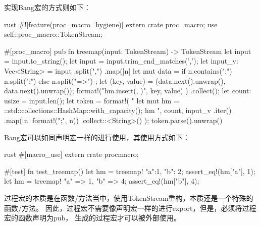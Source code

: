 实现Bang宏的方式则如下：
\begin{code-block}{rust}
#![feature(proc_macro_hygiene)]
extern crate proc_macro;
use self::proc_macro::TokenStream;

#[proc_macro]
pub fn treemap(input: TokenStream) -> TokenStream {
    let input = input.to_string();
    let input = input.trim_end_matches(',');
    let input_v: Vec<String> = input
        .split(",")
        .map(|n| {
            let mut data = if n.contains(":") {
                n.split(":")
            } else {
                n.split("=>")
            };
            let (key, value) = (data.next().unwrap(), data.next().unwrap());
            format!("hm.insert({}, {})", key, value)
        })
        .collect();
    let count: usize = input.len();
    let token = format!(
        "{{
        let mut hm = ::std::collections::HashMap::with_capacity({});
        {}
        hm
    }}",
        count,
        input_v
            .iter()
            .map(|n| format!("{};", n))
            .collect::<String>()
    );
    token.parse().unwrap()
}
\end{code-block}

Bang宏可以如同声明宏一样的进行使用，其使用方式如下：
\begin{code-block}{rust}
#[macro_use]
extern crate procmacro;

#[test]
fn test_treemap() {
    let hm = treemap! {"a":1, "b": 2};
    assert_eq!(hm["a"], 1);
    let hm = treemap! {"a" => 1, "b" => 4};
    assert_eq!(hm["b"], 4);
}
\end{code-block}

过程宏的本质是在函数/方法当中，使用TokenStream重构，本质还是一个特殊的函数/方法。
因此，过程宏不需要像声明宏一样的进行export，但是，必须将过程宏的函数声明为pub，
生成的过程宏才可以被外部使用。

